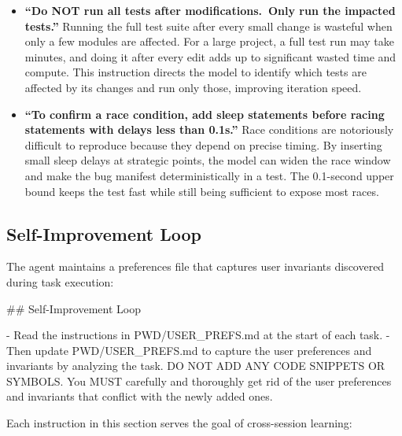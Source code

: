 \documentclass{article}
\begin{document}
\begin{itemize}[nosep]
\item \textbf{``Do NOT run all tests after modifications.\ Only run
  the impacted tests.''}  Running the full test suite after every
  small change is wasteful when only a few modules are affected.  For
  a large project, a full test run may take minutes, and doing it
  after every edit adds up to significant wasted time and compute.
  This instruction directs the model to identify which tests are
  affected by its changes and run only those, improving iteration
  speed.

\item \textbf{``To confirm a race condition, add sleep statements
  before racing statements with delays less than 0.1s.''}  Race
  conditions are notoriously difficult to reproduce because they
  depend on precise timing.  By inserting small sleep delays at
  strategic points, the model can widen the race window and make the
  bug manifest deterministically in a test.  The 0.1-second upper
  bound keeps the test fast while still being sufficient to expose
  most races.
\end{itemize}

\subsection{Self-Improvement Loop}

The agent maintains a preferences file that captures user invariants
discovered during task execution:

\begin{prompt}
## Self-Improvement Loop

- Read the instructions in PWD/USER_PREFS.md at the start
  of each task.
- Then update PWD/USER_PREFS.md to capture the user
  preferences and invariants by analyzing the task. DO NOT
  ADD ANY CODE SNIPPETS OR SYMBOLS. You MUST carefully and
  thoroughly get rid of the user preferences and invariants
  that conflict with the newly added ones.
\end{prompt}

\noindent Each instruction in this section serves the goal of
cross-session learning:
\end{document}
